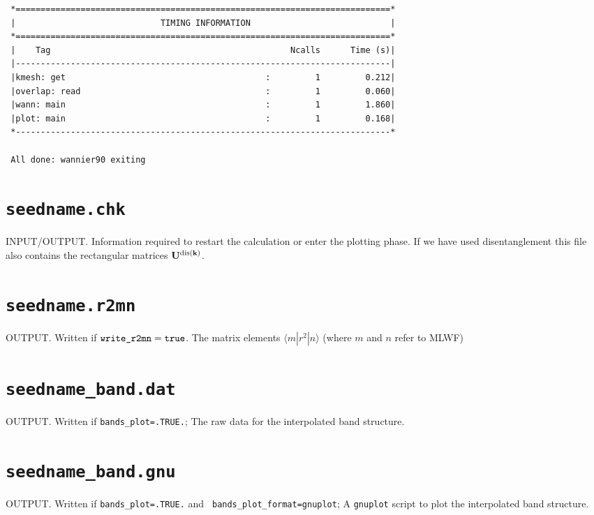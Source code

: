 \begin{verbatim}
 *===========================================================================*
 |                             TIMING INFORMATION                            |
 *===========================================================================*
 |    Tag                                                Ncalls      Time (s)|
 |---------------------------------------------------------------------------|
 |kmesh: get                                        :         1         0.212|
 |overlap: read                                     :         1         0.060|
 |wann: main                                        :         1         1.860|
 |plot: main                                        :         1         0.168|
 *---------------------------------------------------------------------------*
 
 All done: wannier90 exiting
\end{verbatim}



\section{{\tt seedname.chk}}
INPUT/OUTPUT. Information required to restart the calculation or enter the
plotting phase. If we have used disentanglement this file also contains the
rectangular matrices $\bf{U}^{{\rm dis}({\bf k})}$.


\section{{\tt seedname.r2mn}}
OUTPUT.
Written if $\verb#write_r2mn#=\verb#true#$. The matrix elements
$\langle m|r^2|n\rangle$ (where $m$ and $n$ refer to MLWF)

\section{{\tt seedname\_band.dat}}
OUTPUT. Written if {\tt bands\_plot=.TRUE.}; The raw data for the
interpolated band structure.

\section{{\tt seedname\_band.gnu}}
OUTPUT. Written if {\tt bands\_plot=.TRUE.} and {\tt
  bands\_plot\_format=gnuplot}; A {\tt gnuplot} script to plot the
  interpolated band structure.

